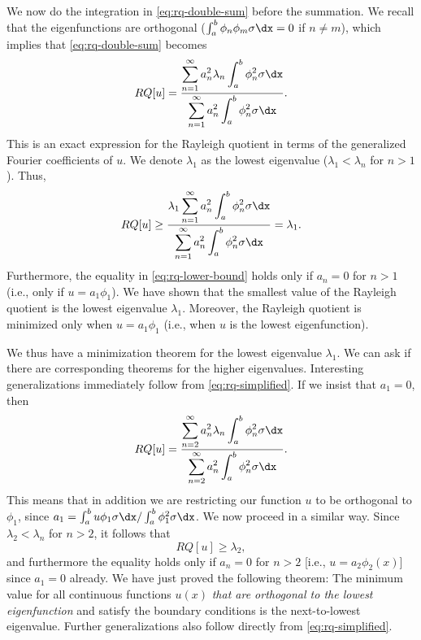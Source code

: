 We now do the integration in \eqref{eq:rq-double-sum} before the summation.  We recall that the eigenfunctions are orthogonal ($\int_a^b \phi_n\phi_m\sigma\dx = 0$ if $n \neq m$), which implies that \eqref{eq:rq-double-sum} becomes
\begin{equation}
\label{eq:rq-simplified}
RQ[u] = \frac{\displaystyle\sum_{n=1}^{\infty} a_n^2\lambda_n\int_a^b \phi_n^2\sigma\dx}{\displaystyle\sum_{n=1}^{\infty} a_n^2\int_a^b \phi_n^2\sigma\dx}.
\end{equation}
This is an exact expression for the Rayleigh quotient in terms of the generalized Fourier coefficients of $u$.  We denote $\lambda_1$ as the lowest eigenvalue ($\lambda_1 < \lambda_n$ for $n > 1$).  Thus,
\begin{equation}
\label{eq:rq-lower-bound}
RQ[u] \ge \frac{\displaystyle\lambda_1\sum_{n=1}^{\infty} a_n^2\int_a^b \phi_n^2\sigma\dx}{\displaystyle\sum_{n=1}^{\infty} a_n^2\int_a^b \phi_n^2\sigma\dx} = \lambda_1.
\end{equation}
Furthermore, the equality in \eqref{eq:rq-lower-bound} holds only if $a_n = 0$ for $n > 1$ (i.e., only if $u = a_1\phi_1$).  We have shown that the smallest value of the Rayleigh quotient is the lowest eigenvalue $\lambda_1$.  Moreover, the Rayleigh quotient is minimized only when $u = a_1\phi_1$ (i.e., when $u$ is the lowest eigenfunction).

We thus have a minimization theorem for the lowest eigenvalue $\lambda_1$.  We can ask if there are corresponding theorems for the higher eigenvalues.  Interesting generalizations immediately follow from \eqref{eq:rq-simplified}.  If we insist that $a_1 = 0$, then
\begin{equation}
\label{eq:rq-second}
RQ[u] = \frac{\displaystyle\sum_{n=2}^{\infty} a_n^2\lambda_n\int_a^b \phi_n^2\sigma\dx}{\displaystyle\sum_{n=2}^{\infty} a_n^2\int_a^b \phi_n^2\sigma\dx}.
\end{equation}
This means that in addition we are restricting our function $u$ to be orthogonal to $\phi_1$, since $a_1 = \int_a^b u\phi_1\sigma\dx / \int_a^b \phi_1^2\sigma\dx$.  We now proceed in a similar way.  Since $\lambda_2 < \lambda_n$ for $n > 2$, it follows that
\[
RQ[u] \ge \lambda_2,
\]
and furthermore the equality holds only if $a_n = 0$ for $n > 2$ [i.e., $u = a_2\phi_2(x)$] since $a_1 = 0$ already.  We have just proved the following theorem: The minimum value for all continuous functions $u(x)$ \textit{that are orthogonal to the lowest eigenfunction} and satisfy the boundary conditions is the next-to-lowest eigenvalue.  Further generalizations also follow directly from \eqref{eq:rq-simplified}.

